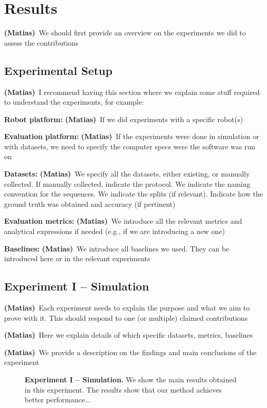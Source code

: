 \documentclass[letterpaper, 10 pt, conference]{ieeeconf}
\newcommand{\matias}[1]{\textcolor{RubineRed}{\textbf{(Matias)}~#1}}
\begin{document}
\section{Results}
\matias{We should first provide an overview on the experiments we did to assess the contributions}

\subsection{Experimental Setup}
\matias{I recommend having this section where we explain some stuff required to understand the experiments, for example:}

\noindent\textbf{Robot platform:} \matias{If we did experiments with a specific robot(s)}

\noindent\textbf{Evaluation platform:} \matias{If the experiments were done in simulation or with datasets, we need to specify the computer specs were the software was run on}

\noindent\textbf{Datasets:} \matias{We specify all the datasets, either existing, or manually collected. If manually collected, indicate the protocol. We indicate the naming convention for the sequences. We indicate the splits (if relevant). Indicate how the ground truth was obtained and accuracy (if pertinent)}

\noindent\textbf{Evaluation metrics:} \matias{We introduce all the relevant metrics and analytical expressions if needed (e.g., if we are introducing a new one)}

\noindent\textbf{Baselines:} \matias{We introduce all baselines we used. They can be introduced here or in the relevant experiments}

\subsection{Experiment I -- Simulation}
\matias{Each experiment needs to explain the purpose and what we aim to prove with it. This should respond to one (or multiple) claimed contributions}

\matias{Here we explain details of which specific datasets, metrics, baselines}

\matias{We provide a description on the findings and main conclusions of the experiment}

\begin{figure}[h]
  \centering
  \caption{\textbf{Experiment I -- Simulation.} We show the main results obtained in this experiment. The results show that our method achieves better performance...}
  \label{fig:exp1}
\end{figure}
\end{document}
